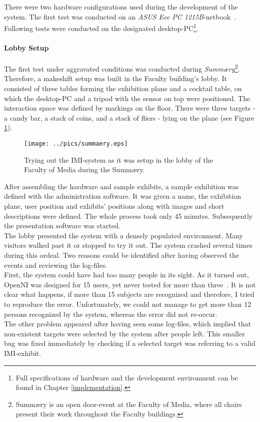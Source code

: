 There were two hardware configurations used during the development of the system. The first test was conducted on an \textit{ASUS Eee PC 1215B}-netbook~\cite{Eee1215B}. Following tests were conducted on the designated desktop-PC\footnote{Full specifications of hardware and the development environment can be found in Chapter \ref{implementation}.}.


\paragraph{Lobby Setup} The first test under aggravated conditions was conducted during \textit{Summ\ae{}ry}\footnote{Summ\ae{}ry is an open door-event at the Faculty of Media, where all chairs present their work throughout the Faculty buildings.}. Therefore, a makeshift setup was built in the Faculty building's lobby. It consisted of three tables forming the exhibition plane and a cocktail table, on which the desktop-PC and a tripod with the sensor on top were positioned. The interaction space was defined by markings on the floor. There were three targets - a candy bar, a stack of coins, and a stack of fliers - lying on the plane (see Figure \ref{fig:summaery_setup}).
\begin{figure}[H]%
\texttt{[image: ../pics/summaery.eps]}%
\caption{Trying out the \ac{IMI}-system as it was setup in the lobby of the Faculty of Media during the Summ\ae{}ry.}%
\label{fig:summaery_setup} %
\end{figure}

After assembling the hardware and sample exhibits, a sample exhibition was defined with the administration software. It was given a name, the exhibition plane, user position and exhibits' positions along with images and short descriptions were defined. The whole process took only 45 minutes. Subsequently the presentation software was started.
\\
The lobby presented the system with a densely populated environment. Many visitors walked past it or stopped to try it out. The system crashed several times during this ordeal. Two reasons could be identified after having observed the events and reviewing the log-files.
\\
First, the system could have had too many people in its sight. As it turned out, OpenNI was designed for 15 users, yet never tested for more than three~\cite{MaxUsersOpenNI}. It is not clear what happens, if more than 15 subjects are recognized and therefore, I tried to reproduce the error. Unfortunately, we could not manage to get more than 12 persons recognized by the system, whereas the error did not re-occur.
\\
The other problem appeared after having seen some log-files, which implied that non-existent targets were selected by the system after people left. This smaller bug was fixed immediately by checking if a selected target was referring to a valid \ac{IMI}-exhibit. 

